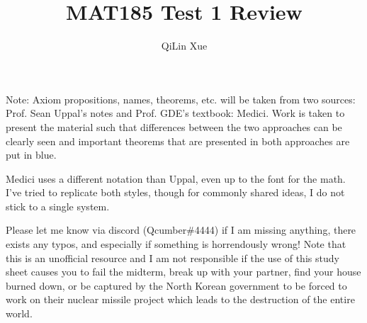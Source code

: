 \documentclass{article}
\title{MAT185 Test 1 Review}
\author{QiLin Xue}
\begin{document}
    \maketitle
    \tableofcontents
    Note: Axiom propositions, names, theorems, etc. will be taken from two sources: Prof. Sean Uppal's notes and Prof. GDE's textbook: Medici. Work is taken to present the material such that differences between the two approaches can be clearly seen and important theorems that are presented in both approaches are put in blue.
    \vspace{2mm}

    Medici uses a different notation than Uppal, even up to the font for the math. I've tried to replicate both styles, though for commonly shared ideas, I do not stick to a single system.
    \vspace{2mm}

    Please let me know via discord (Qcumber\#4444) if I am missing anything, there exists any typos, and especially if something is horrendously wrong! Note that this is an unofficial resource and I am not responsible if the use of this study sheet causes you to fail the midterm, break up with your partner, find your house burned down, or be captured by the North Korean government to be forced to work on their nuclear missile project which leads to the destruction of the entire world.
\end{document}
